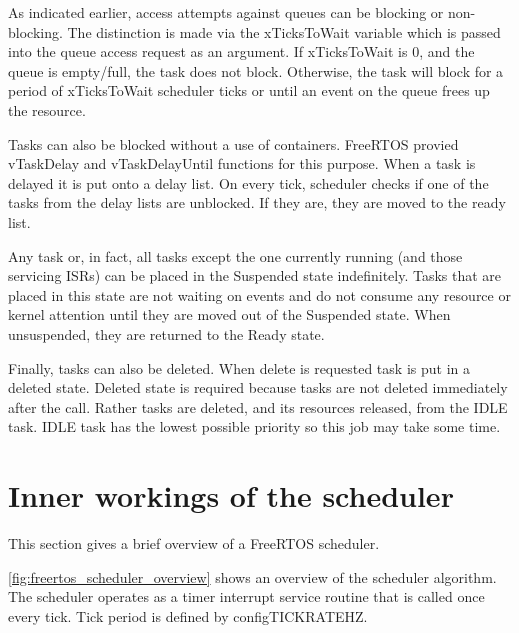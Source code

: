 As indicated earlier, access attempts against queues can be blocking or non-blocking.
The distinction is made via the xTicksToWait variable which is passed into the queue
access request as an argument. If xTicksToWait is 0, and the queue is empty/full, the
task does not block. Otherwise, the task will block for a period of xTicksToWait
scheduler ticks or until an event on the queue frees up the resource.

Tasks can also be blocked without a use of containers. FreeRTOS provied vTaskDelay and vTaskDelayUntil functions for this purpose. When a task is delayed it is put onto a delay list. On every tick, scheduler checks if one of the tasks from the delay lists are unblocked. If they are, they are moved to the ready list.

Any task or, in fact, all tasks except the one currently running (and those servicing ISRs)
can be placed in the Suspended state indefinitely. Tasks that are placed in this state are
not waiting on events and do not consume any resource or kernel attention until they are
moved out of the Suspended state. When unsuspended, they are returned to the Ready state.

Finally, tasks can also be deleted. When delete is requested task is put in a deleted state. Deleted state is required because tasks are not deleted immediately after the call. Rather tasks are deleted, and its resources released, from the IDLE task. IDLE task has the lowest possible priority so this job may take some time.

\section{Inner workings of the scheduler}

This section gives a brief overview of a FreeRTOS scheduler.

\autoref{fig:freertos_scheduler_overview} shows an overview of the scheduler algorithm. The scheduler operates as a timer interrupt service routine that is called once every tick. Tick period is defined by configTICK\textunderscore RATE\textunderscore HZ. 

